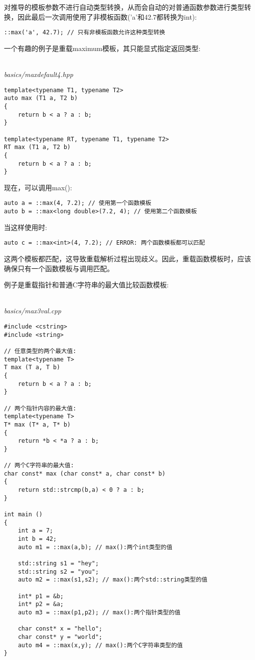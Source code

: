 对推导的模板参数不进行自动类型转换，从而会自动的对普通函数参数进行类型转换，因此最后一次调用使用了非模板函数('a'和42.7都转换为int):

\begin{lstlisting}[style=styleCXX]
::max('a', 42.7); // 只有非模板函数允许这种类型转换
\end{lstlisting}

一个有趣的例子是重载maximum模板，其只能显式指定返回类型:

\hspace*{\fill} \\ %
\noindent
\textit{basics/maxdefault4.hpp}
\begin{lstlisting}[style=styleCXX]
template<typename T1, typename T2>
auto max (T1 a, T2 b)
{
	return b < a ? a : b;
}

template<typename RT, typename T1, typename T2>
RT max (T1 a, T2 b)
{
	return b < a ? a : b;
}
\end{lstlisting}

现在，可以调用max():

\begin{lstlisting}[style=styleCXX]
auto a = ::max(4, 7.2); // 使用第一个函数模板
auto b = ::max<long double>(7.2, 4); // 使用第二个函数模板
\end{lstlisting}

当这样使用时:

\begin{lstlisting}[style=styleCXX]
auto c = ::max<int>(4, 7.2); // ERROR: 两个函数模板都可以匹配
\end{lstlisting}

这两个模板都匹配，这导致重载解析过程出现歧义。因此，重载函数模板时，应该确保只有一个函数模板与调用匹配。

例子是重载指针和普通C字符串的最大值比较函数模板:

\hspace*{\fill} \\ %
\noindent
\textit{basics/max3val.cpp}
\begin{lstlisting}[style=styleCXX]
#include <cstring>
#include <string>

// 任意类型的两个最大值:
template<typename T>
T max (T a, T b)
{
	return b < a ? a : b;
}

// 两个指针内容的最大值:
template<typename T>
T* max (T* a, T* b)
{
	return *b < *a ? a : b;
}

// 两个C字符串的最大值:
char const* max (char const* a, char const* b)
{
	return std::strcmp(b,a) < 0 ? a : b;
}

int main ()
{
	int a = 7;
	int b = 42;
	auto m1 = ::max(a,b); // max():两个int类型的值
	
	std::string s1 = "hey";
	std::string s2 = "you";
	auto m2 = ::max(s1,s2); // max():两个std::string类型的值
	
	int* p1 = &b;
	int* p2 = &a;
	auto m3 = ::max(p1,p2); // max():两个指针类型的值
	
	char const* x = "hello";
	char const* y = "world";
	auto m4 = ::max(x,y); // max():两个C字符串类型的值
}
\end{lstlisting}

